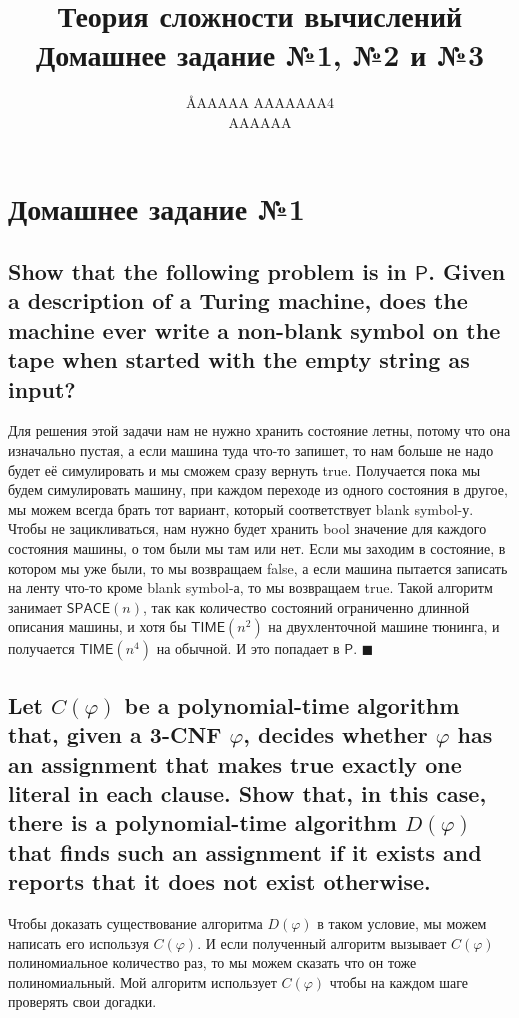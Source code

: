 \documentclass{article}
\title{Теория сложности вычислений \\ Домашнее задание №1, №2 и №3}
\author{\AA{AAAAA AAAAAAA}{4} \\ AAAAAA}
\let\temp\phi
\let\phi\varphi
\let\varphi\temp
\begin{document}
  \maketitle

  \section{Домашнее задание №1}
  \setcounter{subsection}{9}
  \subsection{Show that the following problem is in $\mathsf{P}$. Given a description of a Turing machine, does the machine ever write a non-blank symbol on the tape when started with the empty string as input?}
  Для решения этой задачи нам не нужно хранить состояние летны, потому что она изначально пустая,
  а если машина туда что-то запишет, то нам больше не надо будет её симулировать и мы сможем сразу вернуть true.
  Получается пока мы будем симулировать машину, при каждом переходе из одного состояния в другое,
  мы можем всегда брать тот вариант, который соответствует blank symbol-у.
  Чтобы не зацикливаться, нам нужно будет хранить bool значение для каждого состояния машины, о том были мы там или нет.
  Если мы заходим в состояние, в котором мы уже были, то мы возвращаем false,
  а если машина пытается записать на ленту что-то кроме blank symbol-а, то мы возвращаем true.
  Такой алгоритм занимает $\mathsf{SPACE}(n)$, так как количество состояний ограниченно длинной описания машины,
  и хотя бы $\mathsf{TIME}(n^2)$ на двухленточной машине тюнинга, и получается $\mathsf{TIME}(n^4)$ на обычной.
  И это попадает в $\mathsf{P}$.
  $\blacksquare$

  \subsection{Let $C(\phi)$ be a polynomial-time algorithm that, given a 3-CNF $\phi$, decides whether $\phi$ has an assignment that makes true exactly one literal in each clause. Show that, in this case, there is a polynomial-time algorithm $D(\phi)$ that finds such an assignment if it exists and reports that it does not exist otherwise.}
  Чтобы доказать существование алгоритма $D(\phi)$ в таком условие, мы можем написать его используя $C(\phi)$.
  И если полученный алгоритм вызывает $C(\phi)$ полиномиальное количество раз, то мы можем сказать что он тоже полиномиальный.
  Мой алгоритм использует $C(\phi)$ чтобы на каждом шаге проверять свои догадки.
\end{document}
